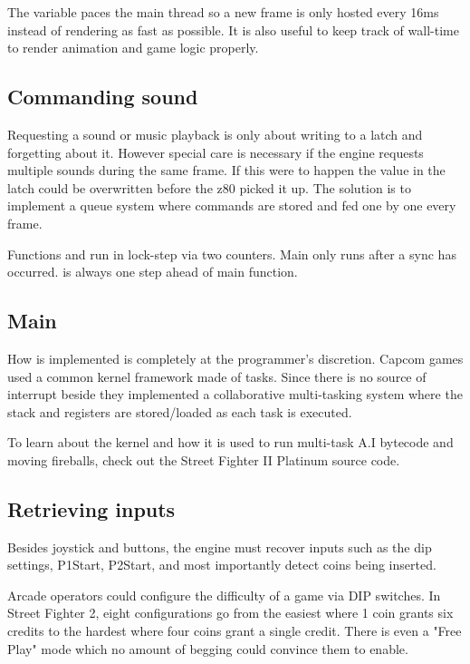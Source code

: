 \begin{trivia}
The  variable paces the main thread so a new frame is only hosted every 16ms instead of rendering as fast as possible. It is also useful to keep track of wall-time to render animation and game logic properly.
\end{trivia}


\subsection{Commanding sound}
Requesting a sound or music playback is only about writing to a latch and forgetting about it. However special care is necessary if the engine requests multiple sounds during the same frame. If this were to happen the value in the latch could be overwritten before the z80 picked it up.
The solution is to implement a queue system where commands are stored and fed one by one every frame. 

Functions  and  run in lock-step via two counters. Main only runs after a sync has occurred.  is always one step ahead of main function.

 

\subsection{Main}
 


How  is implemented is completely at the programmer's discretion. Capcom games used a common kernel framework made of tasks. Since there is no source of interrupt beside  they implemented a collaborative multi-tasking system where the stack and registers are stored/loaded as each task is executed.

To learn about the kernel and how it is used to run multi-task A.I bytecode and moving fireballs, check out the Street Fighter II Platinum source code\cite{sf2platinium}.

\subsection{Retrieving inputs}
Besides joystick and buttons, the engine must recover inputs such as the dip settings, P1Start, P2Start, and most importantly detect coins being inserted.

\begin{trivia}
Arcade operators could configure the difficulty of a game via DIP switches. In Street Fighter 2, eight configurations go from the easiest where 1 coin grants six credits to the hardest where four coins grant a single credit. There is even a "Free Play" mode which no amount of begging could convince them to enable\cite{sf2manual}.
\end{trivia}

